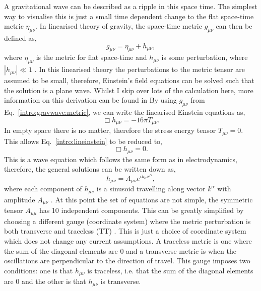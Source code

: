 A gravitational wave can be described as a ripple in this space time.
The simplest way to visualise this is just a small time dependent change to the flat space-time metric $\eta_{\mu\nu}$.
In linearised theory of gravity, the space-time metric $g_{\mu \nu}$ can then be defined as,
\begin{equation}
\label{intro:gravwave:metric}
    g_{\mu \nu} = \eta_{\mu \nu} + h_{\mu \nu},
\end{equation}
where $ \eta_{\mu \nu}$ is the metric for flat space-time and $h_{\mu \nu}$ is some perturbation, where $|h_{\mu \nu}| \ll 1$ \citep{Flanagan2005TheTheory}. 
In this linearised theory the perturbations to the metric tensor are assumed to be small, therefore, Einstein's field equations can be solved such that the solution is a plane wave. 
Whilst I skip over lots of the calculation here, more information on this derivation can be found in \citep{Flanagan2005TheTheory,}
By using $g_{\mu \nu}$ from Eq.~\ref{intro:gravwave:metric}, we can write the linearised Einstein equations as,
\begin{equation}
\label{intro:lineinstein}
    \Box h_{\mu \nu} = -16 \pi T_{\mu\nu}.
\end{equation}
In empty space there is no matter, therefore the stress energy tensor $T_{\mu \nu} = 0$.
This allows Eq.~\ref{intro:lineinstein} to be reduced to, 
\begin{equation}
    \Box h_{\mu \nu} = 0.
\end{equation}
This is a wave equation which follows the same form as in electrodynamics, therefore, the general solutions can be written down as,
\begin{equation}
    h_{\mu\nu} = A_{\mu\nu}e^{ik_{\alpha} x^{\alpha}},
\end{equation}
where each component of $h_{\mu \nu}$ is a sinusoid travelling along vector $k^{\alpha}$ with amplitude $A_{\mu\nu}$ \citep{Capano2011SearchingData}.
At this point the set of equations are not simple, the symmetric tensor $A_{\mu \mu}$ has 10 independent components.
This can be greatly simplified by choosing a different gauge (coordinate system) where the metric perturbation is both transverse and traceless (TT) \citep{Flanagan2005TheTheory}.
This is just a choice of coordinate system which does not change any current assumptions. A traceless metric is one where the sum of the diagonal elements are 0 and a transverse metric is when the oscillations are perpendicular to the direction of travel. 
This gauge imposes two conditions: one is that $h_{\mu \nu}$ is traceless, i.e. that the sum of the diagonal elements are 0 and the other is that $h_{\mu \nu}$ is transverse. 
